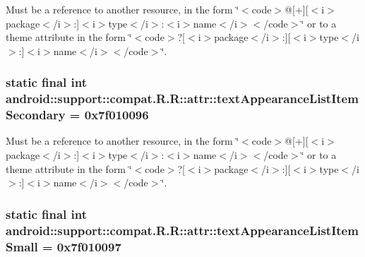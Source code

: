 Must be a reference to another resource, in the form \char`\"{}$<$code$>$@\mbox{[}+\mbox{]}\mbox{[}$<$i$>$package$<$/i$>$:\mbox{]}$<$i$>$type$<$/i$>$:$<$i$>$name$<$/i$>$$<$/code$>$\char`\"{} or to a theme attribute in the form \char`\"{}$<$code$>$?\mbox{[}$<$i$>$package$<$/i$>$:\mbox{]}\mbox{[}$<$i$>$type$<$/i$>$:\mbox{]}$<$i$>$name$<$/i$>$$<$/code$>$\char`\"{}. \hypertarget{classandroid_1_1support_1_1compat_1_1_r_1_1attr_b55b544107e64f7630d71634042e7ddc}{
\subsubsection[{textAppearanceListItemSecondary}]{\setlength{\rightskip}{0pt plus 5cm}static final int android::support::compat.R.R::attr::textAppearanceListItemSecondary = 0x7f010096}}
\label{classandroid_1_1support_1_1compat_1_1_r_1_1attr_b55b544107e64f7630d71634042e7ddc}


Must be a reference to another resource, in the form \char`\"{}$<$code$>$@\mbox{[}+\mbox{]}\mbox{[}$<$i$>$package$<$/i$>$:\mbox{]}$<$i$>$type$<$/i$>$:$<$i$>$name$<$/i$>$$<$/code$>$\char`\"{} or to a theme attribute in the form \char`\"{}$<$code$>$?\mbox{[}$<$i$>$package$<$/i$>$:\mbox{]}\mbox{[}$<$i$>$type$<$/i$>$:\mbox{]}$<$i$>$name$<$/i$>$$<$/code$>$\char`\"{}. \hypertarget{classandroid_1_1support_1_1compat_1_1_r_1_1attr_ae36404a4ce5ad7e65cb22abc455e06f}{
\subsubsection[{textAppearanceListItemSmall}]{\setlength{\rightskip}{0pt plus 5cm}static final int android::support::compat.R.R::attr::textAppearanceListItemSmall = 0x7f010097}}
\label{classandroid_1_1support_1_1compat_1_1_r_1_1attr_ae36404a4ce5ad7e65cb22abc455e06f}


